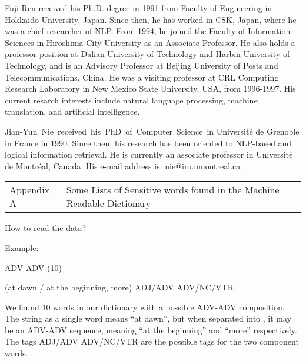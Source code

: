 \begin{biography}

\biotitle{}

{
Fuji Ren received his Ph.D. degree in 1991 from Faculty of Engineering in
Hokkaido University, Japan. Since then, he has worked in CSK, Japan, where
he was a chief researcher of NLP. From 1994, he joined the Faculty of
Information Sciences in Hiroshima City University as an Associate
Professor. He also holds a professor position at Dalian University of
Technology and Harbin University of Technology, and is an
Advisory Professor at Beijing University of Posts and Telecommunications,
China. He was a visiting professor at CRL Computing Research Laboratory in
New Mexico State University, USA, from 1996-1997. His current resarch
interests include natural language processing, machine translation, and
artificial intelligence. 
}

{
Jian-Yun $\,$Nie $\,$received $\,$his $\,$PhD $\,$of $\,$Computer $\,$Science $\,$in Universit\'e de Grenoble in France in 1990. 
Since then, his research has been oriented to NLP-based and logical information 
retrieval. 
He is currently an associate professor in Universit\'e de Montr\'eal, Canada. His e-mail address is: nie@iro.umontreal.ca
}


\end{biography}

\bigskip


\vspace{-4mm}
{\Large\bf
\bigskip
\noindent
\begin{tabular}{@{}p{}@{\quad}p{}}
  Appendix A &
  Some Lists of Sensitive words found in the Machine Readable Dictionary\\
\end{tabular}
\bigskip
}

How to read the data?

Example:
\begin{center}
ADV-ADV (10)

 (at dawn / at the beginning, more) ADJ/ADV ADV/NC/VTR
\end{center}


We found 10 words in our dictionary with a possible ADV-ADV composition. The string 
as a single word means ``at dawn'', but when separated into ,
it may be an ADV-ADV sequence, meaning ``at the beginning'' and ``more'' respectively.
The tags ADJ/ADV ADV/NC/VTR are the possible tags for the two component words.


